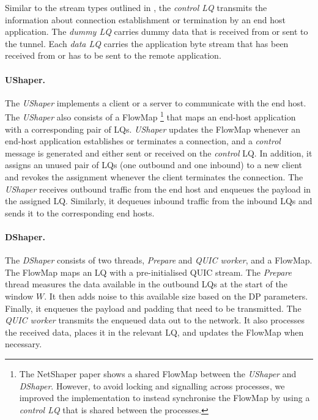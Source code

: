 Similar to the stream types outlined in , the \textit{control LQ} transmits the information about connection establishment or termination by an end host application. 
The \textit{dummy LQ} carries dummy data that is received from or sent to the tunnel.
Each \textit{data LQ} carries the application byte stream that has been received from or has to be sent to the remote application.


\paragraph{UShaper.}
The \textit{UShaper} implements a client or a server to communicate with the end host.
The \textit{UShaper} also consists of a FlowMap 
\footnote{The NetShaper paper shows a shared FlowMap between the \textit{UShaper} and \textit{DShaper}. However, to avoid locking and signalling across processes, we improved the implementation to instead synchronise the FlowMap by using a \textit{control LQ} that is shared between the processes.}
that maps an end-host application with a corresponding pair of LQs.
\textit{UShaper} updates the FlowMap whenever an end-host application establishes or terminates a connection, and a \textit{control} message is generated and either sent or received on the \textit{control} LQ.
In addition, it assigns an unused pair of LQs (one outbound and one inbound) to a new client and revokes the assignment whenever the client terminates the connection.
The \textit{UShaper} receives outbound traffic from the end host and enqueues the payload in the assigned LQ.
Similarly, it dequeues inbound traffic from the inbound LQs and sends it to the corresponding end hosts.

\paragraph{DShaper.}
The \textit{DShaper} consists of two threads, \textit{Prepare} and \textit{QUIC worker}, and a FlowMap.
The FlowMap maps an LQ with a pre-initialised QUIC stream.
The \textit{Prepare} thread measures the data available in the outbound LQs at the start of the window $W$.
It then adds noise to this available size based on the DP parameters.
Finally, it enqueues the payload and padding that need to be transmitted.
The \textit{QUIC worker} transmits the enqueued data out to the network.
It also processes the received data, places it in the relevant LQ, and updates the FlowMap when necessary.

